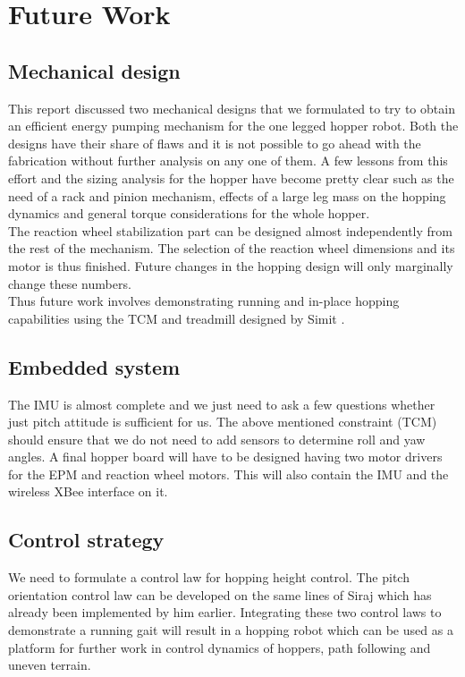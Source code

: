 \chapter{Future Work}
\label{chap:future}

\section*{Mechanical design}
This report discussed two mechanical designs that we formulated to try to obtain an efficient energy pumping mechanism for
the one legged hopper robot. Both the designs have their share of flaws and it is not possible to go ahead with the fabrication
without further analysis on any one of them. A few lessons from this effort and the sizing analysis for the hopper have become
pretty clear such as the need of a rack and pinion mechanism, effects of a large leg mass on the hopping dynamics and general torque
considerations for the whole hopper.\\

The reaction wheel stabilization part can be designed almost independently from the rest of
the mechanism. The selection of the reaction wheel dimensions and its motor is thus finished. Future changes in the hopping design
will only marginally change these numbers.\\

Thus future work involves demonstrating running and in-place hopping capabilities using the TCM and treadmill designed by Simit \cite{simit}.

\section*{Embedded system}
The IMU is almost complete and we just need to ask a few questions whether just pitch attitude is sufficient for us. The above mentioned constraint (TCM) should ensure that we do not need to add sensors to determine roll and yaw angles. A final hopper
board will have to be designed having two motor drivers for the EPM and reaction wheel motors. This will also contain the IMU and
the wireless XBee interface on it.

\section*{Control strategy}
We need to formulate a control law for hopping height control. The pitch orientation control law can be developed on the same lines
of Siraj \cite{siraj} which has already been implemented by him earlier. Integrating these two control laws to demonstrate a running
gait will result in a hopping robot which can be used as a platform for further work in control dynamics of hoppers, path following
\cite{bowleg} and uneven terrain.
